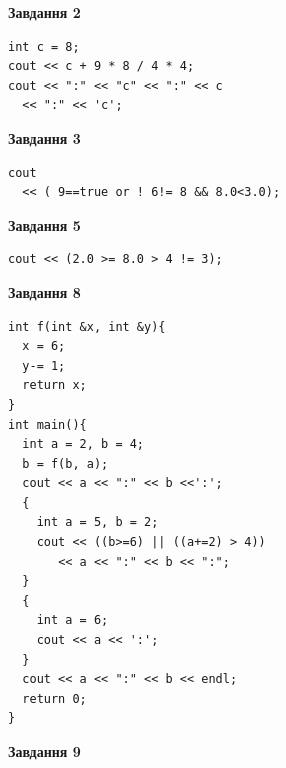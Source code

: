 \documentclass[12pt, ukrainian]{article}
\begin{document}
{\begin {large}
\begin{minipage}[t]{7.0cm}
\end{minipage}
\vline \hspace{1mm}
\begin{minipage}[t]{11.0cm}

\begin{center}
\textbf{Завдання 2}
\end{center}
\vspace{-8mm}

\begin{verbatim}
int c = 8;
cout << c + 9 * 8 / 4 * 4;
cout << ":" << "c" << ":" << c 
  << ":" << 'c';
\end{verbatim}



\begin{center}
\textbf{Завдання 3}
\end{center}
\vspace{-8mm}

\begin{verbatim}
cout 
  << ( 9==true or ! 6!= 8 && 8.0<3.0);
\end{verbatim}



\begin{center}
\textbf{Завдання 5}
\end{center}
\vspace{-8mm}

\begin{verbatim}
cout << (2.0 >= 8.0 > 4 != 3);
\end{verbatim}



\begin{center}
\textbf{Завдання 8}
\end{center}
\vspace{-8mm}

\begin{verbatim}
int f(int &x, int &y){
  x = 6;
  y-= 1;
  return x;
}
int main(){
  int a = 2, b = 4;
  b = f(b, a);
  cout << a << ":" << b <<':';
  {
    int a = 5, b = 2;
    cout << ((b>=6) || ((a+=2) > 4))
       << a << ":" << b << ":";
  }
  {
    int a = 6;
    cout << a << ':';
  }
  cout << a << ":" << b << endl;
  return 0;
}
\end{verbatim}

\end{minipage}


\begin{minipage}[t]{7.0cm}

\begin{center}
\textbf{Завдання 9}
\end{center}
\vspace{-8mm}


\end{minipage}
\end{large}}
\end{document}
